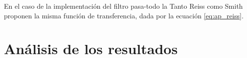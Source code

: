 \documentclass[]{article}
\begin{document}
\begin{multicols}{2}
En el caso de la implementación del filtro pasa-todo la Tanto Reiss como Smith
proponen la misma función de transferencia, dada por la ecuación
\eqref{eq:ap_reiss}.
\section{Análisis de los resultados}


\printbibliography
\end{multicols}
\end{document}
